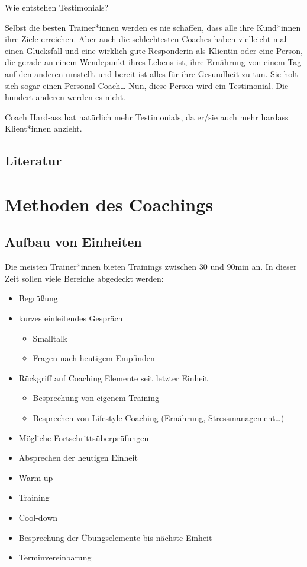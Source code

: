 \documentclass[
  letterpaper,
  DIV=11,
  numbers=noendperiod]{scrreprt}
\providecommand{\tightlist}{%
  \setlength{\itemsep}{0pt}\setlength{\parskip}{0pt}}
\begin{document}
Wie entstehen Testimonials?

Selbst die besten Trainer*innen werden es nie schaffen, dass alle ihre
Kund*innen ihre Ziele erreichen. Aber auch die schlechtesten Coaches
haben vielleicht mal einen Glücksfall und eine wirklich gute Responderin
als Klientin oder eine Person, die gerade an einem Wendepunkt ihres
Lebens ist, ihre Ernährung von einem Tag auf den anderen umstellt und
bereit ist alles für ihre Gesundheit zu tun. Sie holt sich sogar einen
Personal Coach\ldots{} Nun, diese Person wird ein Testimonial. Die
hundert anderen werden es nicht.

Coach Hard-ass hat natürlich mehr Testimonials, da er/sie auch mehr
hardass Klient*innen anzieht.

\section{Literatur}\label{literatur-7}


\chapter{Methoden des Coachings}\label{methoden-des-coachings}

\section{Aufbau von Einheiten}\label{aufbau-von-einheiten}

Die meisten Trainer*innen bieten Trainings zwischen 30 und 90min an. In
dieser Zeit sollen viele Bereiche abgedeckt werden:

\begin{itemize}
\tightlist
\item
  Begrüßung
\item
  kurzes einleitendes Gespräch

  \begin{itemize}
  \tightlist
  \item
    Smalltalk
  \item
    Fragen nach heutigem Empfinden
  \end{itemize}
\item
  Rückgriff auf Coaching Elemente seit letzter Einheit

  \begin{itemize}
  \tightlist
  \item
    Besprechung von eigenem Training
  \item
    Besprechen von Lifestyle Coaching (Ernährung,
    Stressmanagement\ldots)
  \end{itemize}
\item
  Mögliche Fortschrittsüberprüfungen
\item
  Absprechen der heutigen Einheit
\item
  Warm-up
\item
  Training
\item
  Cool-down
\item
  Besprechung der Übungselemente bis nächste Einheit
\item
  Terminvereinbarung
\end{itemize}
\end{document}
